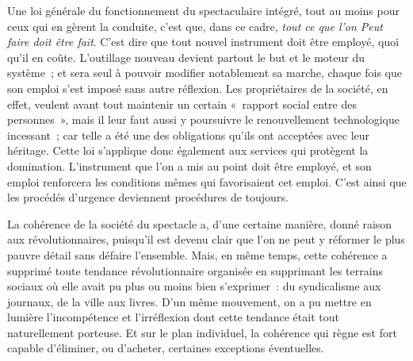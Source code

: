\documentclass[french,twoside]{book} %
\def\bignobreak{\ifdim\lastskip<\bigskipamount
  \removelastskip\nopagebreak\bigskip\fi}
\newcommand{\labelblock}[1]{\bigbreak{\color{rubric}\noindent\textbf{#1}\par}\bignobreak}
\begin{document}
\labelblock{XXIX}

\noindent Une loi générale du fonctionnement du spectaculaire intégré, tout au moins pour ceux qui en gèrent la conduite, c’est que, dans ce cadre, \emph{tout ce que l’on Peut faire doit être fait}. C’est dire que tout nouvel instrument doit être employé, quoi qu’il en coûte. L’outillage nouveau devient partout le but et le moteur du système ; et sera seul à pouvoir modifier notablement sa marche, chaque fois que son emploi s’est imposé sans autre réflexion. Les propriétaires de la société, en effet, veulent avant tout maintenir un certain « rapport social entre des personnes », mais il leur faut aussi y poursuivre le renouvellement technologique incessant ; car telle a été une des obligations qu’ils ont acceptées avec leur héritage. Cette loi s’applique donc également aux services qui protègent la domination. L’instrument que l’on a mis au point doit être employé, et son emploi renforcera les conditions mêmes qui favorisaient cet emploi. C’est ainsi que les procédés d’urgence deviennent procédures de toujours.\par
La cohérence de la société du spectacle a, d’une certaine manière, donné raison aux révolutionnaires, puisqu’il est devenu clair que l’on ne peut y réformer le plus pauvre détail sans défaire l’ensemble. Mais, en même temps, cette cohérence a supprimé toute tendance révolutionnaire organisée en supprimant les terrains sociaux où elle avait pu plus ou moins bien s’exprimer : du syndicalisme aux journaux, de la ville aux livres. D’un même mouvement, on a pu mettre en lumière l’incompétence et l’irréflexion dont cette tendance était tout naturellement porteuse. Et sur le plan individuel, la cohérence qui règne est fort capable d’éliminer, ou d’acheter, certaines exceptions éventuelles.\par

\labelblock{XXX}
\end{document}
